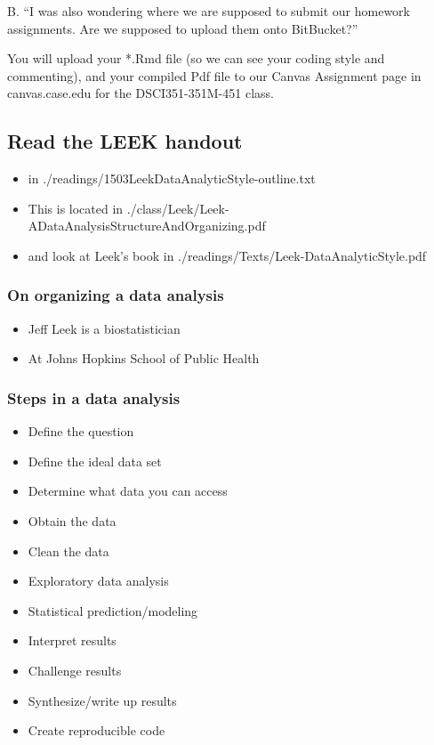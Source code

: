 \documentclass[]{article}
\providecommand{\tightlist}{%
  \setlength{\itemsep}{0pt}\setlength{\parskip}{0pt}}
\begin{document}
B. ``I was also wondering where we are supposed to submit our homework
assignments. Are we supposed to upload them onto BitBucket?''

You will upload your *.Rmd file (so we can see your coding style and
commenting), and your compiled Pdf file to our Canvas Assignment page in
canvas.case.edu for the DSCI351-351M-451 class.

\hypertarget{read-the-leek-handout}{%
\subsection{Read the LEEK handout}\label{read-the-leek-handout}}

\begin{itemize}
\tightlist
\item
  in ./readings/1503LeekDataAnalyticStyle-outline.txt
\item
  This is located in
  ./class/Leek/Leek-ADataAnalysisStructureAndOrganizing.pdf
\item
  and look at Leek's book in ./readings/Texts/Leek-DataAnalyticStyle.pdf
\end{itemize}

\hypertarget{on-organizing-a-data-analysis}{%
\subsubsection{On organizing a data
analysis}\label{on-organizing-a-data-analysis}}

\begin{itemize}
\tightlist
\item
  Jeff Leek is a biostatistician
\item
  At Johns Hopkins School of Public Health
\end{itemize}

\hypertarget{steps-in-a-data-analysis}{%
\subsubsection{Steps in a data
analysis}\label{steps-in-a-data-analysis}}

\begin{itemize}
\tightlist
\item
  Define the question
\item
  Define the ideal data set
\item
  Determine what data you can access
\item
  Obtain the data
\item
  Clean the data
\item
  Exploratory data analysis
\item
  Statistical prediction/modeling
\item
  Interpret results
\item
  Challenge results
\item
  Synthesize/write up results
\item
  Create reproducible code
\end{itemize}
\end{document}
